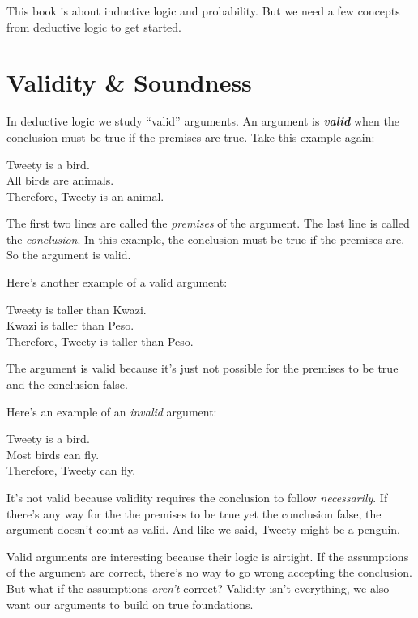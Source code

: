 \documentclass[justified]{tufte-book}
\theoremstyle{definition}
\theoremstyle{definition}
\theoremstyle{definition}
\theoremstyle{definition}
\theoremstyle{remark}
\begin{document}
This book is about inductive logic and probability. But we need a few concepts from deductive logic to get started.

\hypertarget{validity-soundness}{%
\section{Validity \& Soundness}\label{validity-soundness}}

In deductive logic we study ``valid'' arguments. An argument is \textbf{\emph{valid}} when the conclusion must be true if the premises are true. Take this example again:

\begin{argument}
Tweety is a bird.\\
All birds are animals.\\
Therefore, Tweety is an animal.
\end{argument}

The first two lines are called the \emph{premises} of the argument. The last line is called the \emph{conclusion}. In this example, the conclusion must be true if the premises are. So the argument is valid.

Here's another example of a valid argument:

\begin{argument}
Tweety is taller than Kwazi.\\
Kwazi is taller than Peso.\\
Therefore, Tweety is taller than Peso.
\end{argument}

The argument is valid because it's just not possible for the premises to be true and the conclusion false.

Here's an example of an \emph{invalid} argument:

\begin{argument}
Tweety is a bird.\\
Most birds can fly.\\
Therefore, Tweety can fly.
\end{argument}

It's not valid because validity requires the conclusion to follow \emph{necessarily}. If there's any way for the the premises to be true yet the conclusion false, the argument doesn't count as valid. And like we said, Tweety might be a penguin.

Valid arguments are interesting because their logic is airtight. If the assumptions of the argument are correct, there's no way to go wrong accepting the conclusion. But what if the assumptions \emph{aren't} correct? Validity isn't everything, we also want our arguments to build on true foundations.
\end{document}
